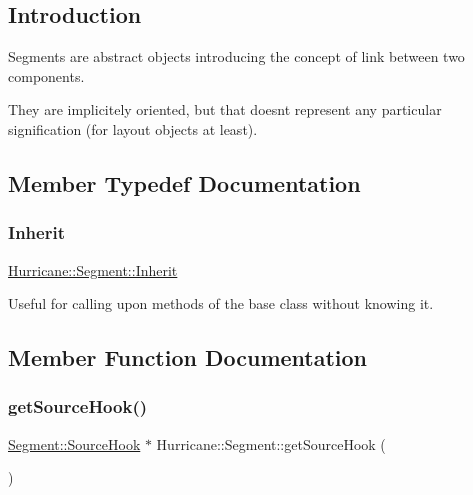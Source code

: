 \hypertarget{classHurricane_1_1Segment_secSegmentIntro}{}\subsection{Introduction}\label{classHurricane_1_1Segment_secSegmentIntro}
Segments are abstract objects introducing the concept of link between two components.

They are implicitely oriented, but that doesn\textquotesingle{}t represent any particular signification (for layout objects at least). 

\subsection{Member Typedef Documentation}
\mbox{\label{classHurricane_1_1Segment_a2f616ba119bb6e9751659814bdbf0320}} 
\subsubsection{\texorpdfstring{Inherit}{Inherit}}
{\footnotesize\ttfamily \hyperlink{classHurricane_1_1Segment_a2f616ba119bb6e9751659814bdbf0320}{Hurricane\+::\+Segment\+::\+Inherit}}

Useful for calling upon methods of the base class without knowing it. 

\subsection{Member Function Documentation}
\mbox{\label{classHurricane_1_1Segment_aa9d0303b444b44d7b8e47d42ac7151eb}} 
\subsubsection{\texorpdfstring{get\+Source\+Hook()}{getSourceHook()}}
{\footnotesize\ttfamily \hyperlink{classHurricane_1_1Segment_1_1SourceHook}{Segment\+::\+Source\+Hook} $\ast$ Hurricane\+::\+Segment\+::get\+Source\+Hook (\begin{DoxyParamCaption}{ }\end{DoxyParamCaption})\hspace{0.3cm}{\ttfamily [inline]}}

